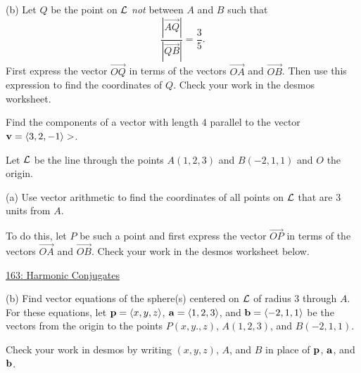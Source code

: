 \documentclass{ximera}
\begin{document}
\begin{question}
\begin{explanation}
\end{explanation}


(b) Let $Q$ be the point on ${\cal L}$ \emph{not} between $A$ and $B$ such that
\[
      \frac{|\overrightarrow{AQ}|}{|\overrightarrow{QB}|} = \frac{3}{5} . 
\]
First express the vector $\overrightarrow{OQ}$ in terms of the vectors $\overrightarrow{OA}$ and $\overrightarrow{OB}$. Then use this expression to find the coordinates of $Q$. Check your work in the desmos worksheet.


\end{question}

\begin{question}  \label{Q:98dfer3vv}
Find the components of a vector with length $4$ parallel to the vector ${\bf v}=\langle 3, 2, -1\rangle>$.
\end{question}

\begin{question}  \label{QP9erf333}
Let ${\cal L}$ be the line through the points $A(1,2,3)$ and $B(-2,1,1)$ and $O$ the origin.

(a) Use vector arithmetic to find the coordinates of all points on ${\cal L}$ that are $3$ units from $A$. 

To do this, let $P$ be such a point and first express the vector $\overrightarrow{OP}$ in terms of the vectors $\overrightarrow{OA}$ and $\overrightarrow{OB}$. Check your work in the desmos worksheet below.

\begin{onlineOnly}
    \begin{center}
\end{center}
\end{onlineOnly}

\href{https://www.desmos.com/3d/kqq5ktp0jw}{163: Harmonic Conjugates}

(b) Find vector equations of the sphere(s) centered on ${\cal L}$ of radius $3$ through $A$. For these equations, let ${\bf p}=\langle x,y,z \rangle$, ${\bf a} = \langle 1,2,3 \rangle$, and ${\bf b} = \langle -2,1,1 \rangle$ be the vectors from the origin to the points $P(x,y.,z)$, $A(1,2,3)$, and $B(-2,1,1)$. 

Check  your work in desmos by writing $(x,y,z)$, $A$, and $B$ in place of ${\bf p}$, ${\bf a}$, and ${\bf b}$.  



\end{question}
\end{document}

